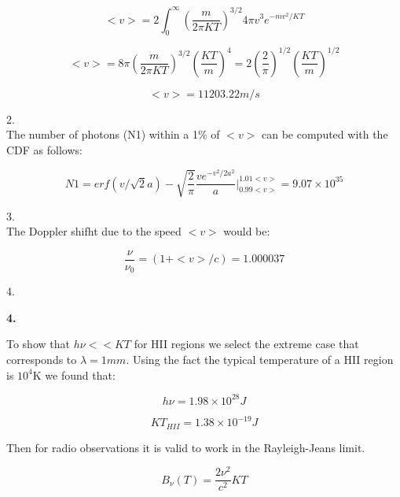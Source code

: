 \documentclass[12pt]{article}
\begin{document}
\begin{equation}
<v> = 2\int_0^{\infty} \left( \dfrac{m}{2\pi KT}  \right)^{3/2} 4\pi v^3 e^{-mv^2/KT}
\end{equation}

\begin{equation}
<v> = 8\pi \left( \dfrac{m}{2\pi KT}  \right)^{3/2} \left(\dfrac{KT}{m}\right)^4
= 2 \left( \dfrac{2}{\pi} \right)^{1/2} \left( \dfrac{KT}{m}  \right)^{1/2}
\end{equation}

\begin{equation}
<v> = 11203.22 m/s
\end{equation}

2. \\ 

The number of photons (N1) within a 1\% of $<v>$ can be computed with the CDF as follows:


\begin{equation}
N1 = erf(v/\sqrt{2}a) - \sqrt{\dfrac{2}{\pi}} \dfrac{v e^{-v^2/2a^2}}{a} \Bigg|_{0.99<v>}^{1.01<v>}  = 9.07\times 10^{35} 
\end{equation}

3. \\

The Doppler shifht due to the speed $<v>$ would be:

\begin{equation}
\dfrac{\nu}{\nu_0} = (1 + <v>/c) =  1.000037
\end{equation}

4. \\ 


\begin{LARGE}
\textbf{4.}
\end{LARGE}

To show that $h \nu << KT$ for HII regions we select the extreme case that
corresponds to $\lambda = 1mm$. Using the fact the typical temperature 
of a HII region is $10^4$K we found that: 

\begin{equation}
h \nu = 1.98 \times 10 ^{28} J
\end{equation} 

\begin{equation}
KT_{HII} = 1.38 \times 10^{-19} J
\end{equation}

Then for radio observations it is valid to work in the Rayleigh-Jeans limit.

\begin{equation}
B_{\nu}(T) = \dfrac{2\nu^2}{c^2}KT
\end{equation}
\end{document}
